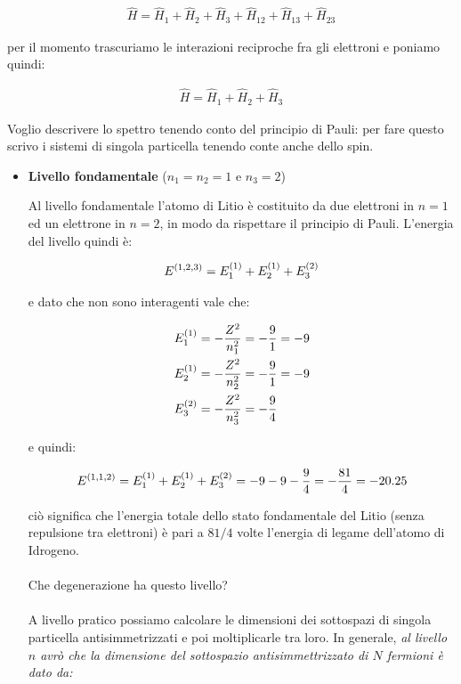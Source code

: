 \begin{align*}
	\hat{H} = \hat{H}_1 + \hat{H}_2 + \hat{H}_3 + \hat{H}_{12} + \hat{H}_{13} + \hat{H}_{23}
\end{align*}

	per il momento trascuriamo le interazioni reciproche fra gli elettroni e poniamo quindi:

\begin{align*}
	\hat{H} = \hat{H}_1 + \hat{H}_2 + \hat{H}_3
\end{align*}

	Voglio descrivere lo spettro tenendo conto del principio di Pauli: per fare questo scrivo i sistemi di singola particella tenendo conte anche dello spin.

\begin{itemize}
	\item \textbf{Livello fondamentale} ($n_1 = n_2 = 1$ e $n_3 = 2$)
	
		Al livello fondamentale l'atomo di Litio è costituito da due elettroni in $n = 1$ ed un elettrone in $n = 2$, in modo da rispettare il principio di Pauli. L'energia del livello quindi è:
		
	\begin{align*}
		E^{\qty(1, 2, 3)} = E_1^{\qty(1)} + E_2^{\qty(1)} + E_3^{\qty(2)}
	\end{align*}
	
		e dato che non sono interagenti vale che:
		
	\begin{align*}
		& E_1^{\qty(1)} = - \frac{Z^2}{n_1^2 } = - \frac{9}{1} = - 9 \\
		& E_2^{\qty(1)} = - \frac{Z^2}{n_2^2 } = - \frac{9}{1} = - 9 \\
		& E_3^{\qty(2)} = - \frac{Z^2}{n_3^2 } = - \frac{9}{4} 
	\end{align*}
	
		e quindi:
	
	\begin{align*}
		E^{\qty(1, 1, 2 )} = E_1^{\qty(1)} + E_2^{\qty(1)} + E_3^{\qty(2)} = - 9 - 9 - \frac{9}{4} = - \frac{81}{4} = -20.25
	\end{align*}
	
		ciò significa che l’energia totale dello stato fondamentale del Litio (senza repulsione tra elettroni) è pari a $81/4$ volte l’energia di legame dell’atomo di Idrogeno.
		\\
		\\
		Che degenerazione ha questo livello? 
		\\
		\\
		A livello pratico possiamo calcolare le dimensioni dei sottospazi di singola particella antisimmetrizzati e poi moltiplicarle tra loro. In generale, \textit{al livello $n$ avrò che la dimensione del sottospazio antisimmettrizzato di $N$ fermioni è dato da:}
	

\end{itemize}

